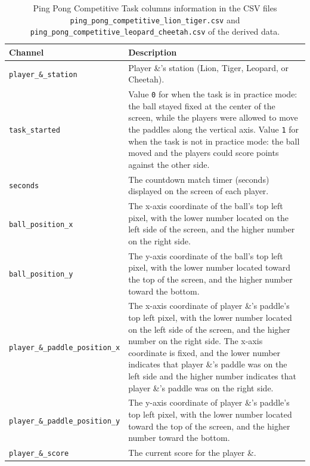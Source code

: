 \begin{table}
\centering
\begin{tabularx}{\textwidth}{lX}
\toprule
Channel & Description \\
\midrule
\texttt{player\_\&\_station} & Player \&'s station (Lion, Tiger, Leopard, or Cheetah).\\
\texttt{task\_started} & Value \texttt{0} for when the task is in practice mode: the ball stayed fixed at the center of the screen, while the players were allowed to move the paddles along the vertical axis. Value \texttt{1} for when the task is not in practice mode: the ball moved and the players could score points against the other side.\\
\texttt{seconds} & The countdown match timer (seconds) displayed on the screen of each player.\\
\texttt{ball\_position\_x} & The x-axis coordinate of the ball's top left pixel, with the lower number located on the left side of the screen, and the higher number on the right side.\\
\texttt{ball\_position\_y} & The y-axis coordinate of the ball's top left pixel, with the lower number located toward the top  of the screen, and the higher number toward the bottom.\\
\texttt{player\_\&\_paddle\_position\_x} & The x-axis coordinate of player \&'s paddle's top left pixel, with the lower number located on the left side of the screen, and the higher number on the right side. The x-axis coordinate is fixed, and the lower number indicates that player \&'s paddle was on the left side and the higher number indicates that player \&'s paddle was on the right side.\\
\texttt{player\_\&\_paddle\_position\_y} & The y-axis coordinate of player \&'s paddle's top left pixel, with the lower number located toward the top of the screen, and the higher number toward the bottom.\\
\texttt{player\_\&\_score} & The current score for the player \&.\\
\bottomrule
\end{tabularx}
\caption{Ping Pong Competitive Task columns information in the CSV files \texttt{ping\_pong\_competitive\_lion\_tiger.csv} and \texttt{ping\_pong\_competitive\_leopard\_cheetah.csv} of the derived data.}
\label{tab:ping_pong_competitive_task_columns}
\end{table}


